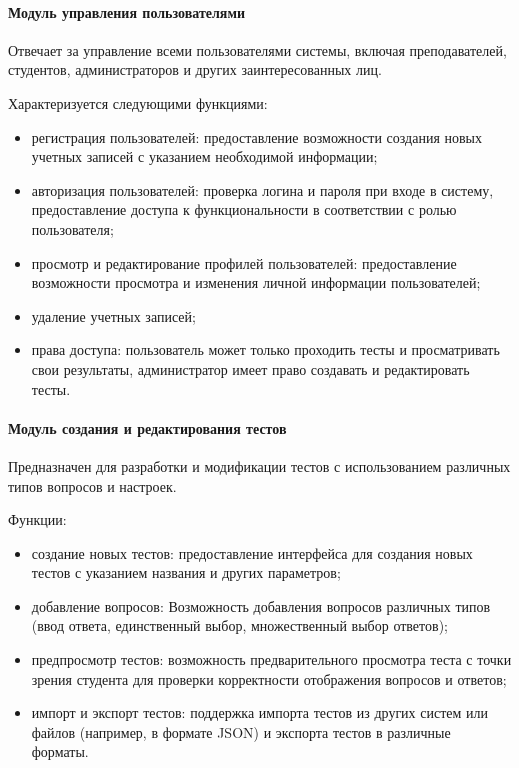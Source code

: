 \paragraph{Модуль управления пользователями}
	
Отвечает за управление всеми пользователями системы, включая преподавателей, студентов, администраторов и других заинтересованных лиц. 

Характеризуется следующими функциями:
\begin{itemize}
	\item регистрация пользователей: предоставление возможности создания новых учетных записей с указанием необходимой информации;
	\item авторизация пользователей: проверка логина и пароля при входе в систему, предоставление доступа к функциональности в соответствии с ролью пользователя;
	\item просмотр и редактирование профилей пользователей: предоставление возможности просмотра и изменения личной информации пользователей;
	\item удаление учетных записей;
	\item права доступа: пользователь может только проходить тесты и просматривать свои результаты, администратор имеет право создавать и редактировать тесты.
\end{itemize}

\paragraph{Модуль создания и редактирования тестов}
	
Предназначен для разработки и модификации тестов с использованием различных типов вопросов и настроек. 
	
Функции: 
\begin{itemize}
	\item создание новых тестов: предоставление интерфейса для создания новых тестов с указанием названия и других параметров;
	\item добавление вопросов: Возможность добавления вопросов различных типов (ввод ответа, единственный выбор, множественный выбор ответов);
	\item предпросмотр тестов: возможность предварительного просмотра теста с точки зрения студента для проверки корректности отображения вопросов и ответов;
	\item импорт и экспорт тестов: поддержка импорта тестов из других систем или файлов (например, в формате JSON) и экспорта тестов в различные форматы.
\end{itemize}

